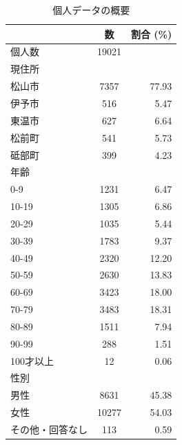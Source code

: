 \documentclass[a4paper,12pt, uplatex]{jsbook}
\begin{document}
\begin{table}[h]
    \centering
    \caption{個人データの概要}
    \begin{tabular}{lcr}
        \toprule
        & 数 & 割合 (\%) \\
        \midrule
        個人数 & 19021 & \\
        現住所 & & \\
        \hspace{1em} 松山市 & 7357 & 77.93 \\
        \hspace{1em} 伊予市 & 516 & 5.47 \\
        \hspace{1em} 東温市 & 627 & 6.64 \\
        \hspace{1em} 松前町 & 541 & 5.73 \\
        \hspace{1em} 砥部町 & 399 & 4.23 \\

        年齢 & & \\
        \hspace{1em} 0-9 & 1231 & 6.47 \\
        \hspace{1em} 10-19 & 1305 & 6.86 \\
        \hspace{1em} 20-29 & 1035 & 5.44 \\
        \hspace{1em} 30-39 & 1783 & 9.37 \\
        \hspace{1em} 40-49 & 2320 & 12.20 \\
        \hspace{1em} 50-59 & 2630 & 13.83 \\
        \hspace{1em} 60-69 & 3423 & 18.00 \\
        \hspace{1em} 70-79 & 3483 & 18.31 \\
        \hspace{1em} 80-89 & 1511 & 7.94 \\
        \hspace{1em} 90-99 & 288 & 1.51 \\
        \hspace{1em} 100才以上 & 12 & 0.06 \\

        性別 & & \\
        \hspace{1em} 男性 & 8631 & 45.38 \\
        \hspace{1em} 女性 & 10277 & 54.03 \\
        \hspace{1em} その他・回答なし & 113 & 0.59 \\


\end{tabular}
\end{table}
\end{document}
